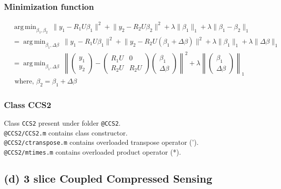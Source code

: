 \documentclass[fleqn, 11pt]{article}
\DeclareMathOperator*{\argmin}{arg\,min}
\begin{document}
\subsubsection*{Minimization function}
\begin{equation*}
    \begin{aligned}
        & \argmin_{\beta_1, \beta_2} \ \lVert y_1 - R_1 U \beta_1 \rVert^2 + \lVert y_2 - R_2 U \beta_2  \rVert^2 + \lambda \lVert \beta_1  \rVert_1 + \lambda \lVert \beta_1 - \beta_2 \rVert_1 \\
        &= \argmin_{\beta_1, \Delta\beta} \ \lVert y_1 - R_1 U \beta_1 \rVert^2 + \lVert y_2 - R_2 U (\beta_1 + \Delta\beta) \rVert^2 + \lambda \lVert \beta_1 \rVert_1 + \lambda \lVert \Delta\beta \rVert_1 \\
        &= \argmin_{\beta_1, \Delta\beta} \ \left\lVert \begin{pmatrix} y_1 \\ y_2 \end{pmatrix} - \begin{pmatrix} R_1 U & 0 \\ R_2 U & R_2 U \end{pmatrix} \begin{pmatrix} \beta_1 \\ \Delta\beta \end{pmatrix} \right\rVert^2 + \lambda \left\lVert \begin{pmatrix} \beta_1 \\ \Delta\beta \end{pmatrix} \right\rVert_1 \\
        & \text{ where, } \beta_2 = \beta_1 + \Delta\beta
    \end{aligned}
\end{equation*}

\subsubsection*{Class CCS2}
Class \texttt{CCS2} present under folder \texttt{@CCS2}.\\
\texttt{@CCS2/CCS2.m} contains class constructor.\\
\texttt{@CCS2/ctranspose.m} contains overloaded transpose operator (').\\
\texttt{@CCS2/mtimes.m} contains overloaded product operator (*).\\


\subsection*{(d) 3 slice Coupled Compressed Sensing}
\end{document}
